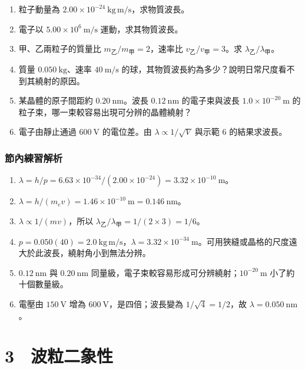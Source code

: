 \documentclass[11pt,a4paper]{article}
\providecommand{\tightlist}{%
  \setlength{\itemsep}{0pt}\setlength{\parskip}{0pt}}
\begin{document}
\begin{enumerate}
\def\labelenumi{\arabic{enumi}.}
\tightlist
\item
  粒子動量為 \(2.00\times10^{-24}\ \mathrm{kg\,m/s}\)，求物質波長。
\item
  電子以 \(5.00\times10^6\ \mathrm{m/s}\) 運動，求其物質波長。
\item
  甲、乙兩粒子的質量比 \(m_\text{乙}/m_\text{甲}=2\)，速率比 \(v_\text{乙}/v_\text{甲}=3\)。求 \(\lambda_\text{乙}/\lambda_\text{甲}\)。
\item
  質量 \(0.050\ \mathrm{kg}\)、速率 \(40\ \mathrm{m/s}\) 的球，其物質波長約為多少？說明日常尺度看不到其繞射的原因。
\item
  某晶體的原子間距約 \(0.20\ \mathrm{nm}\)。波長 \(0.12\ \mathrm{nm}\) 的電子束與波長 \(1.0\times10^{-20}\ \mathrm m\) 的粒子束，哪一束較容易出現可分辨的晶體繞射？
\item
  電子由靜止通過 \(600\ \mathrm V\) 的電位差。由 \(\lambda\propto1/\sqrt V\) 與示範 6 的結果求波長。
\end{enumerate}

\subsubsection{節內練習解析}\label{ux7bc0ux5167ux7df4ux7fd2ux89e3ux6790-1}

\begin{enumerate}
\def\labelenumi{\arabic{enumi}.}
\tightlist
\item
  \(\lambda=h/p=6.63\times10^{-34}/(2.00\times10^{-24})=3.32\times10^{-10}\ \mathrm m\)。
\item
  \(\lambda=h/(m_ev)=1.46\times10^{-10}\ \mathrm m=0.146\ \mathrm{nm}\)。
\item
  \(\lambda\propto1/(mv)\)，所以 \(\lambda_\text{乙}/\lambda_\text{甲}=1/(2\times3)=1/6\)。
\item
  \(p=0.050(40)=2.0\ \mathrm{kg\,m/s}\)，\(\lambda=3.32\times10^{-34}\ \mathrm m\)。可用狹縫或晶格的尺度遠大於此波長，繞射角小到無法分辨。
\item
  \(0.12\ \mathrm{nm}\) 與 \(0.20\ \mathrm{nm}\) 同量級，電子束較容易形成可分辨繞射；\(10^{-20}\ \mathrm m\) 小了約十個數量級。
\item
  電壓由 \(150\ \mathrm V\) 增為 \(600\ \mathrm V\)，是四倍；波長變為 \(1/\sqrt4=1/2\)，故 \(\lambda=0.050\ \mathrm{nm}\)。
\end{enumerate}

\section{3　波粒二象性}\label{ux6ce2ux7c92ux4e8cux8c61ux6027}
\end{document}
